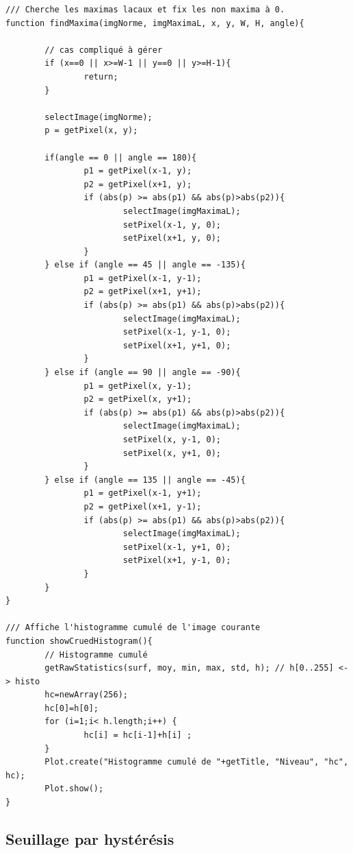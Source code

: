\documentclass[a4paper,11pt]{article}
\begin{document}
\begin{lstlisting}[caption=Macro de calcul des maxima locaux]
/// Cherche les maximas lacaux et fix les non maxima à 0. 
function findMaxima(imgNorme, imgMaximaL, x, y, W, H, angle){

        // cas compliqué à gérer
        if (x==0 || x>=W-1 || y==0 || y>=H-1){
                return;
        }
        
        selectImage(imgNorme);
        p = getPixel(x, y);

        if(angle == 0 || angle == 180){
                p1 = getPixel(x-1, y);
                p2 = getPixel(x+1, y);
                if (abs(p) >= abs(p1) && abs(p)>abs(p2)){
                        selectImage(imgMaximaL);
                        setPixel(x-1, y, 0);
                        setPixel(x+1, y, 0);
                }
        } else if (angle == 45 || angle == -135){
                p1 = getPixel(x-1, y-1);
                p2 = getPixel(x+1, y+1);
                if (abs(p) >= abs(p1) && abs(p)>abs(p2)){
                        selectImage(imgMaximaL);
                        setPixel(x-1, y-1, 0);
                        setPixel(x+1, y+1, 0);
                }
        } else if (angle == 90 || angle == -90){
                p1 = getPixel(x, y-1);
                p2 = getPixel(x, y+1);
                if (abs(p) >= abs(p1) && abs(p)>abs(p2)){
                        selectImage(imgMaximaL);
                        setPixel(x, y-1, 0);
                        setPixel(x, y+1, 0);
                }
        } else if (angle == 135 || angle == -45){
                p1 = getPixel(x-1, y+1);
                p2 = getPixel(x+1, y-1);
                if (abs(p) >= abs(p1) && abs(p)>abs(p2)){
                        selectImage(imgMaximaL);
                        setPixel(x-1, y+1, 0);
                        setPixel(x+1, y-1, 0);
                }
        }
}

/// Affiche l'histogramme cumulé de l'image courante
function showCruedHistogram(){
        // Histogramme cumulé
        getRawStatistics(surf, moy, min, max, std, h); // h[0..255] <-> histo
        hc=newArray(256);
        hc[0]=h[0];
        for (i=1;i< h.length;i++) {
                hc[i] = hc[i-1]+h[i] ;
        }
        Plot.create("Histogramme cumulé de "+getTitle, "Niveau", "hc", hc);
        Plot.show();
}
  \end{lstlisting}
  
  \newpage

  \subsection{Seuillage par hystérésis}
  
\end{document}
